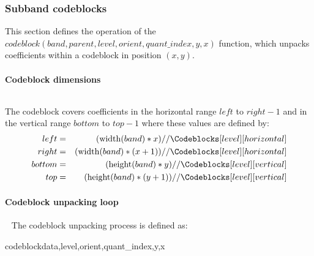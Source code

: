 \subsubsection{Subband codeblocks}
\label{codeblocks}

This section defines the operation of the 
$codeblock(band,parent,level, orient,quant\_index,y,x)$ function, which unpacks
coefficients within a 
codeblock in position $(x,y)$.

\begin{comment}
[Include a figure here]
\end{comment}

\paragraph{Codeblock dimensions}
$\ $\newline

The codeblock covers coefficients in the horizontal range $left$ to $right-1$ and in the vertical
range $bottom$ to $top-1$ where these values are defined by:
\begin{eqnarray*}
  left & = & (\width(band)*x)//\Codeblocks[level][horizontal] \\
  right & = & (\width(band)*(x+1))//\Codeblocks[level][horizontal] \\
  bottom & = & (\height(band)*y)//\Codeblocks[level][vertical] \\
  top & = & (\height(band)*(y+1))//\Codeblocks[level][vertical]
\end{eqnarray*}

\paragraph{Codeblock unpacking loop}
$\ $\newline$\ $\newline
The codeblock unpacking process is defined as:

\begin{pseudo}{codeblock}{data,level,orient,quant\_index,y,x}
      \bsELSE
      \bsEND
    \bsEND
  \bsEND
\bsEND

\end{pseudo}


